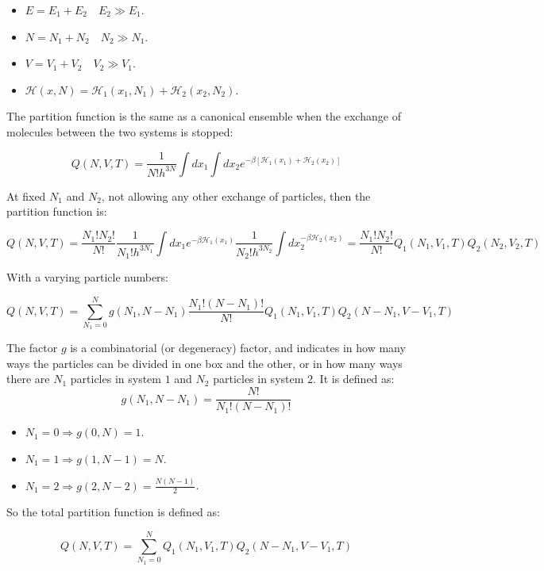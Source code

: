 \begin{multicols}{2}
	\begin{itemize}
		\item $E = E_1 + E_2\quad E_2\gg E_1$.
		\item $N = N_1 + N_2\quad N_2\gg N_1$.
		\item $V = V_1 + V_2\quad V_2\gg V_1$.
		\item $\mathcal{H}(x, N) = \mathcal{H}_1(x_1, N_1) + \mathcal{H}_2(x_2, N_2)$.
	\end{itemize}
\end{multicols}

The partition function is the same as a canonical ensemble when the exchange of molecules between the two systems is stopped:

$$Q(N, V, T) = \frac{1}{N!h^{3N}}\int dx_1\int dx_2e^{-\beta[\mathcal{H}_1(x_1) + \mathcal{H}_2(x_2)]}$$

At fixed $N_1$ and $N_2$, not allowing any other exchange of particles, then the partition function is:

$$Q(N, V, T) = \frac{N_1!N_2!}{N!}\frac{1}{N_1!h^{3N_1}}\int dx_1 e^{-\beta\mathcal{H}_1(x_1)}\frac{1}{N_2!h^{3N_2}}\int dx_2^{-\beta\mathcal{H}_2(x_2)} = \frac{N_1!N_2!}{N!}Q_1(N_1, V_1, T)Q_2(N_2, V_2, T)$$

With a varying particle numbers:

$$Q(N, V, T) = \sum\limits_{N_1=0}^Ng(N_1, N-N_1)\frac{N_1!(N-N_1)!}{N!}Q_1(N_1, V_1, T)Q_2(N-N_1, V-V_1, T)$$

The factor $g$ is a combinatorial (or degeneracy) factor, and indicates in how many ways the particles can be divided in one box and the other, or in how many ways there are $N_1$ particles in system $1$ and $N_2$ particles in system $2$.
It is defined as:
$$g(N_1, N-N_1) = \frac{N!}{N_1!(N-N_1)!}$$

\begin{multicols}{3}
	\begin{itemize}
		\item $N_1 = 0\Rightarrow g(0, N) = 1$.
		\item $N_1 = 1\Rightarrow g(1, N-1) = N$.
		\item $N_1 = 2\Rightarrow g(2, N-2) = \frac{N(N-1)}{2}$.
	\end{itemize}
\end{multicols}

So the total partition function is defined as:

$$Q(N, V, T) = \sum\limits_{N_1=0}^NQ_1(N_1, V_1, T)Q_2(N-N_1, V-V_1, T)$$


